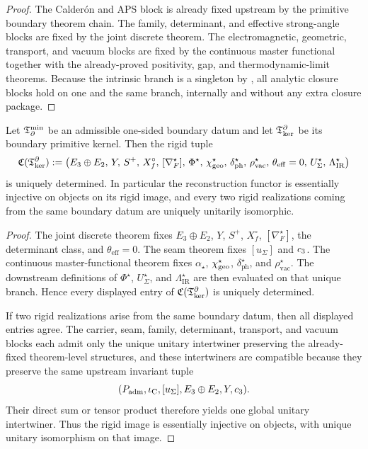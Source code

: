 \begin{proof}
The Calder\'on and APS block is already fixed upstream by the primitive boundary theorem chain.
The family, determinant, and effective strong-angle blocks are fixed by the joint discrete theorem.
The electromagnetic, geometric, transport, and vacuum blocks are fixed by the continuous master
functional together with the already-proved positivity, gap, and thermodynamic-limit theorems.
Because the intrinsic branch is a singleton by , all
analytic closure blocks hold on one and the same branch, internally and without any extra closure
package.
\end{proof}

\begin{theorem}
\label{thm:rigid-reconstruction-core}
\label{thm:canonical-rigid-reconstruction-essential-injective}
Let $\mathfrak T_{\partial}^{\min}$ be an admissible one-sided boundary datum and let $\mathfrak T_{\mathrm{ker}}^\partial$ be its boundary
primitive kernel. Then the rigid tuple
\[
\mathfrak C(\mathfrak T_{\mathrm{ker}}^\partial)
:=
\bigl(
E_3\oplus E_2,\,
Y,\,
S^+,\,
X_f^\circ,\,
[\nabla_F^\star],\,
\Phi^\star,\,
\chi_{\mathrm{geo}}^\star,\,
\delta_{\mathrm{ph}}^\star,\,
\rho_{\mathrm{vac}}^\star,\,
\theta_{\mathrm{eff}}=0,\,
U_\Sigma^\star,\,
\Lambda_{\mathrm{IR}}^\star
\bigr)
\]
is uniquely determined. In particular the reconstruction functor is essentially injective on
objects on its rigid image, and every two rigid realizations coming from the same boundary datum are
uniquely unitarily isomorphic.
\end{theorem}

\begin{proof}
The joint discrete theorem fixes $E_3\oplus E_2$, $Y$, $S^+$, $X_f^\circ$, $[\nabla_F^\star]$, the
determinant class, and $\theta_{\mathrm{eff}}=0$. The seam theorem fixes $[u_\Sigma]$ and
$c_3$. The continuous master-functional theorem fixes $\alpha_\star$, $\chi_{\mathrm{geo}}^\star$,
$\delta_{\mathrm{ph}}^\star$, and $\rho_{\mathrm{vac}}^\star$. The downstream definitions of
$\Phi^\star$, $U_\Sigma^\star$, and $\Lambda_{\mathrm{IR}}^\star$ are then evaluated on that unique
branch. Hence every displayed entry of $\mathfrak C(\mathfrak T_{\mathrm{ker}}^\partial)$ is uniquely determined.

If two rigid realizations arise from the same boundary datum, then all displayed entries agree. The
carrier, seam, family, determinant, transport, and vacuum blocks each admit only the unique
unitary intertwiner preserving the already-fixed theorem-level structures, and these intertwiners
are compatible because they preserve the same upstream invariant tuple
\[
(P_{\mathrm{adm}},\iota_{\mathrm C},[u_\Sigma],E_3\oplus E_2,Y,c_3).
\]
Their direct sum or tensor product therefore yields one global unitary intertwiner. Thus the rigid
image is essentially injective on objects, with unique unitary isomorphism on that image.
\end{proof}

